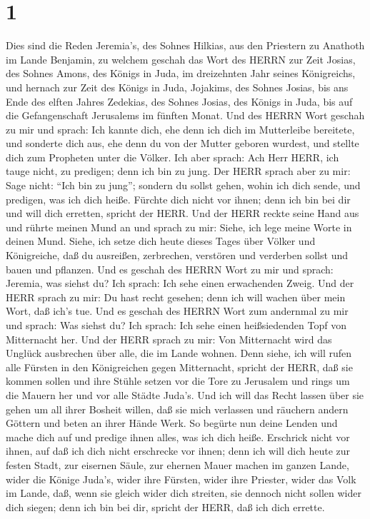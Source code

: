 \hypertarget{section}{%
\section{1}\label{section}}

 Dies sind die Reden Jeremia's, des Sohnes Hilkias, aus den
Priestern zu Anathoth im Lande Benjamin,  zu welchem geschah
das Wort des HERRN zur Zeit Josias, des Sohnes Amons, des Königs in
Juda, im dreizehnten Jahr seines Königreichs,  und hernach
zur Zeit des Königs in Juda, Jojakims, des Sohnes Josias, bis ans Ende
des elften Jahres Zedekias, des Sohnes Josias, des Königs in Juda, bis
auf die Gefangenschaft Jerusalems im fünften Monat.  Und des
HERRN Wort geschah zu mir und sprach:  Ich kannte dich, ehe
denn ich dich im Mutterleibe bereitete, und sonderte dich aus, ehe denn
du von der Mutter geboren wurdest, und stellte dich zum Propheten unter
die Völker.  Ich aber sprach: Ach Herr HERR, ich tauge
nicht, zu predigen; denn ich bin zu jung.  Der HERR sprach
aber zu mir: Sage nicht: ``Ich bin zu jung''; sondern du sollst gehen,
wohin ich dich sende, und predigen, was ich dich heiße. 
Fürchte dich nicht vor ihnen; denn ich bin bei dir und will dich
erretten, spricht der HERR.  Und der HERR reckte seine Hand
aus und rührte meinen Mund an und sprach zu mir: Siehe, ich lege meine
Worte in deinen Mund.  Siehe, ich setze dich heute dieses
Tages über Völker und Königreiche, daß du ausreißen, zerbrechen,
verstören und verderben sollst und bauen und pflanzen.  Und
es geschah des HERRN Wort zu mir und sprach: Jeremia, was siehst du? Ich
sprach: Ich sehe einen erwachenden Zweig.  Und der HERR
sprach zu mir: Du hast recht gesehen; denn ich will wachen über mein
Wort, daß ich's tue.  Und es geschah des HERRN Wort zum
andernmal zu mir und sprach: Was siehst du? Ich sprach: Ich sehe einen
heißsiedenden Topf von Mitternacht her.  Und der HERR
sprach zu mir: Von Mitternacht wird das Unglück ausbrechen über alle,
die im Lande wohnen.  Denn siehe, ich will rufen alle
Fürsten in den Königreichen gegen Mitternacht, spricht der HERR, daß sie
kommen sollen und ihre Stühle setzen vor die Tore zu Jerusalem und rings
um die Mauern her und vor alle Städte Juda's.  Und ich will
das Recht lassen über sie gehen um all ihrer Bosheit willen, daß sie
mich verlassen und räuchern andern Göttern und beten an ihrer Hände
Werk.  So begürte nun deine Lenden und mache dich auf und
predige ihnen alles, was ich dich heiße. Erschrick nicht vor ihnen, auf
daß ich dich nicht erschrecke vor ihnen;  denn ich will
dich heute zur festen Stadt, zur eisernen Säule, zur ehernen Mauer
machen im ganzen Lande, wider die Könige Juda's, wider ihre Fürsten,
wider ihre Priester, wider das Volk im Lande,  daß, wenn
sie gleich wider dich streiten, sie dennoch nicht sollen wider dich
siegen; denn ich bin bei dir, spricht der HERR, daß ich dich errette.

